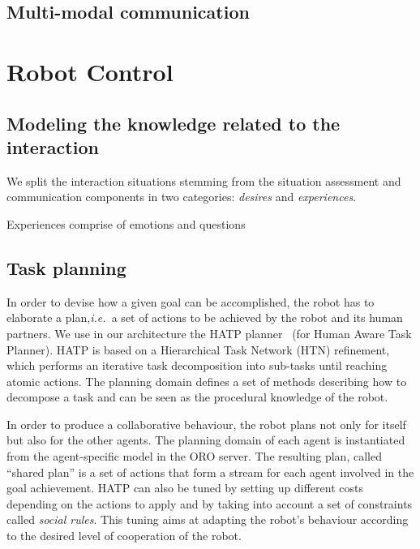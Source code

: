 \documentclass[letterpaper, 10 pt, conference]{ieeeconf}  %
\newcommand{\ie}{{\textit{i.e.\ }}}
\begin{document}
\subsection{Multi-modal communication}

\section{Robot Control}
\label{sect|ctrl}

\subsection{Modeling the knowledge related to the interaction}

We split the interaction situations stemming from the situation assessment and
communication components in two categories: \emph{desires} and
\emph{experiences}.

Experiences comprise of emotions and questions

\subsection{Task planning}

In order to devise how a given goal can be accomplished, the robot has to
elaborate a plan,\ie a set of actions to be achieved by the robot and its human
partners.  We use in our architecture the HATP planner~\cite{Alili2009} (for
Human Aware Task Planner).  HATP is based on a Hierarchical Task Network (HTN)
refinement, which performs an iterative task decomposition into sub-tasks until
reaching atomic actions.  The planning domain defines a set of methods
describing how to decompose a task and can be seen as the procedural knowledge
of the robot.

In order to produce a collaborative behaviour, the robot plans not only for
itself but also for the other agents. The planning domain of each agent is
instantiated from the agent-specific model in the ORO server. The resulting
plan, called ``shared plan'' is a set of actions that form a stream for each
agent involved in the goal achievement. HATP can also be tuned by setting up
different costs depending on the actions to apply and by taking into account a
set of constraints called \emph{social rules}. This tuning aims at adapting the
robot's behaviour according to the desired level of cooperation of the robot.
\end{document}
